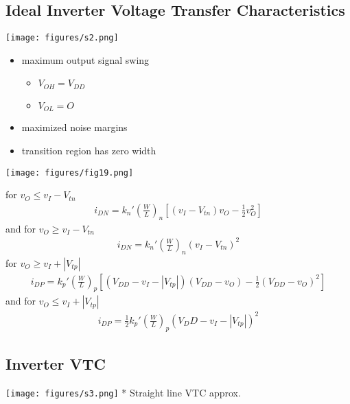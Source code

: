 \documentclass[12pt]{article}
\begin{document}
    \subsection*{Ideal Inverter Voltage Transfer Characteristics}

    \begin{center}
        \texttt{[image: figures/s2.png]}
    \end{center}

    \begin{itemize}
        \item maximum output signal swing
        \begin{itemize}
            \item $V_{OH} = V_{DD}$
            \item $V_{OL} = O$
        \end{itemize}
        \item maximized noise margins
        \item transition region has zero width
    \end{itemize}

    \begin{center}
        \texttt{[image: figures/fig19.png]}
    \end{center}

    for $v_O \leq v_I - V_{tn}$
    \begin{align}
        i_{DN} = k_n'\left(\frac{W}{L}\right)_n\left[(v_I - V_{tn})v_O-\frac{1}{2}v_O^2\right]
    \end{align}
    and for $v_O \geq v_I - V_{tn}$
    \begin{align}
        i_{DN} = k_n'\left(\frac{W}{L}\right)_n(v_I - V_{tn})^2
    \end{align}
    for $v_O \geq v_I +|V_{tp}|$
    \begin{align}
        i_{DP} = k_p'\left(\frac{W}{L}\right)_p\left[(V_{DD}-v_I-|V_{tp}|)(V_{DD}-v_O)-\frac{1}{2}(V_{DD}-v_O)^2\right]
    \end{align}
    and for $v_O \leq v_I +|V_{tp}|$
    \begin{align}
        i_{DP} = \frac{1}{2}k_p'\left(\frac{W}{L}\right)_p(V_DD-v_I-|V_{tp}|)^2
    \end{align}

    \subsection*{Inverter VTC}

    \texttt{[image: figures/s3.png]}
    * Straight line VTC approx.
\end{document}
